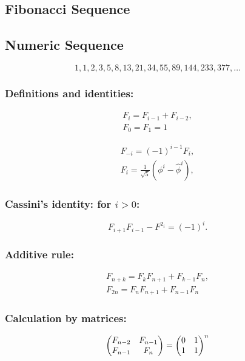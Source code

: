 
\subsection{Fibonacci Sequence}


\subsection{Numeric Sequence}

\[1, 1, 2, 3, 5, 8, 13, 21, 34, 55, 89, 144, 233, 377, \ldots \]

\medskip

\subsubsection{Definitions and identities:}


\begin{align}
 	F_{i} = F_{i-1} + F_{i-2}, \\
	F_{0} = F_{1} = 1
\end{align}

\begin{align}
 F_{-i} = (-1)^{i-1} F_{i}, \\
F_{i} = \frac{1}{\sqrt{5}} \left(\phi^{i} - \hat{\phi}^{i}\right),
\end{align}

\subsubsection{Cassini's identity: for $i > 0$:}

\[F_{i+1} F_{i-1} - F^{2_{i}} = (-1)^{i}.\]

\smallskip

\subsubsection{Additive rule:}

\begin{align}
F_{n+k} = F_{k} F_{n+1} + F_{k-1} F_{n}, \\
F_{2n} = F_{n} F_{n+1} + F_{n-1} F_{n}
\end{align}

\smallskip

\subsubsection{Calculation by matrices:}

\begin{align}
\begin{pmatrix}
F_{n-2} &F_{n-1} \cr
F_{n-1} &F_{n} \cr
\end{pmatrix}
=
\begin{pmatrix}
0 &1 \cr
1 &1 \cr
\end{pmatrix}^{n}
\end{align}
\medskip

